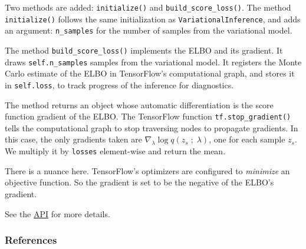 Two methods are added: \texttt{initialize()} and
\texttt{build_score_loss()}.  The method \texttt{initialize()} follows
the same initialization as \texttt{VariationalInference}, and adds an
argument: \texttt{n_samples} for the number of samples from the
variational model.

The method \texttt{build_score_loss()} implements the ELBO and its
gradient. It draws \texttt{self.n_samples} samples from the
variational model. It registers the Monte Carlo
estimate of the ELBO in TensorFlow's computational graph, and stores it
in \texttt{self.loss}, to track progress of the inference for diagnostics.

The method returns an object whose automatic differentiation is the
score function gradient of the ELBO. The TensorFlow function
\texttt{tf.stop_gradient()} tells the computational graph to stop
traversing nodes to propagate gradients. In this case,
the only gradients taken are $\nabla_\lambda \log q(z_s\;;\;\lambda)$,
one for each sample $z_s$. We multiply it by \texttt{losses}
element-wise and return the mean.

There is a nuance here. TensorFlow's optimizers are configured to
\emph{minimize} an objective function. So the gradient is set to be
the negative of the ELBO's gradient.

See the \href{../api/index.html}{API} for more details.

\subsubsection{References}\label{references}

